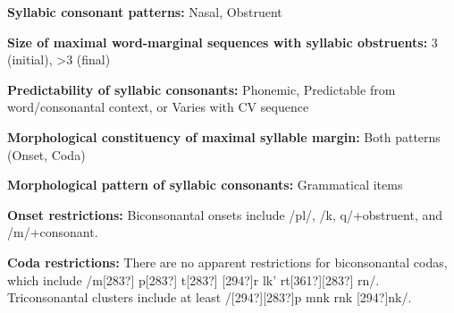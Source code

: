 \begin{styleBody}
\textbf{Syllabic consonant patterns:} Nasal, Obstruent
\end{styleBody}

\begin{styleBody}
\textbf{Size of maximal word{}-marginal sequences with syllabic obstruents:} 3 (initial), {\textgreater}3 (final)
\end{styleBody}

\begin{styleBody}
\textbf{Predictability of syllabic consonants:} Phonemic, Predictable from word/consonantal context, or Varies with CV sequence
\end{styleBody}

\begin{styleBody}
\textbf{Morphological constituency of maximal syllable margin:} Both patterns (Onset, Coda)
\end{styleBody}

\begin{styleBody}
\textbf{Morphological pattern of syllabic consonants:} Grammatical items
\end{styleBody}

\begin{styleBody}
\textbf{Onset restrictions:} Biconsonantal onsets include /pl/, /k, q/+obstruent, and /m/+consonant.
\end{styleBody}

\begin{styleBody}
\textbf{Coda restrictions:} There are no apparent restrictions for biconsonantal codas, which include /m[283?] p[283?] t[283?] [294?]r lk' rt[361?][283?] rn/. Triconsonantal clusters include at least /[294?][283?]p mnk rnk [294?]nk/.
\end{styleBody}

